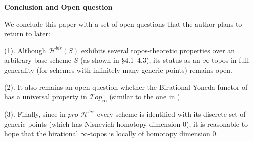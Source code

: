\textbf{Conclusion and Open question}

We conclude this paper with a set of open questions that the author plans to return to later:

(1). Although $\mathcal{H}^{bir}(S)$ exhibits several topos-theoretic properties over an arbitrary base scheme $S$ (as shown in \S4.1–4.3), its status as an $\infty$-topos in full generality (for schemes with infinitely many generic points) remains open. 


(2). It also remains an open question whether the Birational Yoneda functor of  has a universal property in $\mathcal{T}op_\infty$ (similar to the one in ).


(3). Finally, since in $pro\mbox{-}\mathcal{H}^{bir}$ every scheme is identified with its discrete set of generic points (which has Nisnevich homotopy dimension $0$), it is reasonable to hope that the birational $\infty$-topos is locally of homotopy dimension $0$.